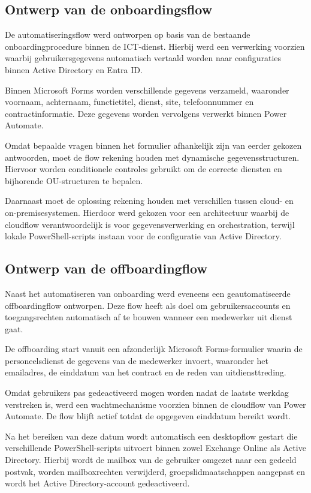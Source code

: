 \subsection{Ontwerp van de onboardingsflow}

De automatiseringsflow werd ontworpen op basis van de bestaande onboardingprocedure binnen de ICT-dienst. Hierbij werd een verwerking voorzien waarbij gebruikersgegevens automatisch vertaald worden naar configuraties binnen Active Directory en Entra ID.

Binnen Microsoft Forms worden verschillende gegevens verzameld, waaronder voornaam, achternaam, functietitel, dienst, site, telefoonnummer en contractinformatie. Deze gegevens worden vervolgens verwerkt binnen Power Automate.

Omdat bepaalde vragen binnen het formulier afhankelijk zijn van eerder gekozen antwoorden, moet de flow rekening houden met dynamische gegevensstructuren. Hiervoor worden conditionele controles gebruikt om de correcte diensten en bijhorende OU-structuren te bepalen.

Daarnaast moet de oplossing rekening houden met verschillen tussen cloud- en on-premisesystemen. Hierdoor werd gekozen voor een architectuur waarbij de cloudflow verantwoordelijk is voor gegevensverwerking en orchestration, terwijl lokale PowerShell-scripts instaan voor de configuratie van Active Directory.

\subsection{Ontwerp van de offboardingflow}

Naast het automatiseren van onboarding werd eveneens een geautomatiseerde offboardingflow ontworpen. Deze flow heeft als doel om gebruikersaccounts en toegangsrechten automatisch af te bouwen wanneer een medewerker uit dienst gaat.

De offboarding start vanuit een afzonderlijk Microsoft Forms-formulier waarin de personeelsdienst de gegevens van de medewerker invoert, waaronder het e\-mail\-adres, de einddatum van het contract en de reden van uitdiensttreding.

Omdat gebruikers pas gedeactiveerd mogen worden nadat de laatste werkdag verstreken is, werd een wachtmechanisme voorzien binnen de cloudflow van Power Automate. De flow blijft actief totdat de opgegeven einddatum bereikt wordt.

Na het bereiken van deze datum wordt automatisch een desktopflow gestart die verschillende PowerShell-scripts uitvoert binnen zowel Exchange Online als Active Directory. Hierbij wordt de mailbox van de gebruiker omgezet naar een gedeeld postvak, worden mailboxrechten verwijderd, groepslidmaatschappen aangepast en wordt het Active Directory-account gedeactiveerd.

